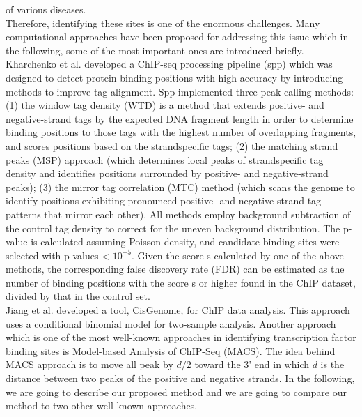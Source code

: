 \documentclass[11pt,letterpaper]{article}
\begin{document}
of various diseases\cite{baxevanis2004bioinformatics}.\\
Therefore, identifying these sites is one of the enormous challenges.
Many computational approaches have been proposed for addressing this issue which in the following, some of the most important ones are introduced briefly.\\
Kharchenko et al. developed a ChIP-seq processing pipeline (spp) which was designed to detect protein-binding positions with high accuracy by introducing methods to improve tag alignment\cite{kim2011short}.
Spp implemented three peak-calling methods: (1) the
window tag density (WTD) is a method that extends positive- and
negative-strand tags by the expected DNA fragment
length in order to determine binding positions to
those tags with the highest number of overlapping
fragments, and scores positions based on the strandspecific
tags; (2) the matching strand peaks (MSP)
approach (which determines local peaks of strandspecific
tag density and identifies positions surrounded
by positive- and negative-strand peaks); (3)
the mirror tag correlation (MTC) method (which
scans the genome to identify positions exhibiting
pronounced positive- and negative-strand tag patterns
that mirror each other). All methods employ background
subtraction of the control tag density to
correct for the uneven background distribution. The
p-value is calculated assuming Poisson density, and
candidate binding sites were selected with p-values < $10^{-5}$.
Given the score s calculated by one of the
above methods, the corresponding false discovery rate
(FDR) can be estimated as the number of binding
positions with the score s or higher found in the
ChIP dataset, divided by that in the control set\cite{kharchenko2008design}.\\
Jiang et al. developed a tool, CisGenome, for ChIP data analysis. This approach uses a conditional binomial model for two-sample analysis\cite{ji2008integrated}.
Another approach which is one of the most well-known approaches in identifying transcription factor binding sites is Model-based Analysis of ChIP-Seq (MACS)\cite{zhang2008model}.
The idea behind MACS approach is to move all peak by $d/2$ toward the 3' end in which $d$ is the distance between two peaks of the positive and negative strands.
In the following, we are going to describe our proposed method and we are going to compare our method to two other well-known approaches.  
\end{document}
